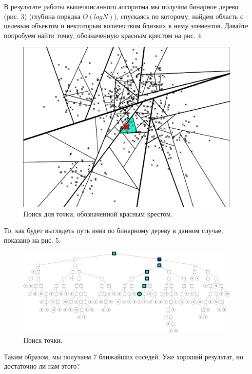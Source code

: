 В результате работы вышеописанного алгоритма мы получим бинарное дерево (рис. 3) (глубина порядка $O(logN)$), спускаясь по которому, найдем область с целевым объектом и нектоторым количеством близких к нему элементов. Давайте попробуем найти точку, обозначенную красным крестом на рис. 4.

\begin{figure}[h]
    \centering
    \includegraphics[width=\textwidth]{chapters/metric/images/heap-pos.png}
    \caption{Поиск для точки, обозначенной красным крестом.}
    \label{fig:heap-pos}
\end{figure}

То, как будет выглядеть путь вниз по бинарному дереву в данном случае, показано на рис. 5. 

\begin{figure}[h]
    \centering
    \includegraphics[width=\textwidth]{chapters/metric/images/heap-pos-graphviz.png}
    \caption{Поиск точки.}
    \label{fig:heap-pos-graph}
\end{figure}

Таким образом, мы получаем 7 ближайших соседей. Уже хороший результат, но достаточно ли нам этого?

